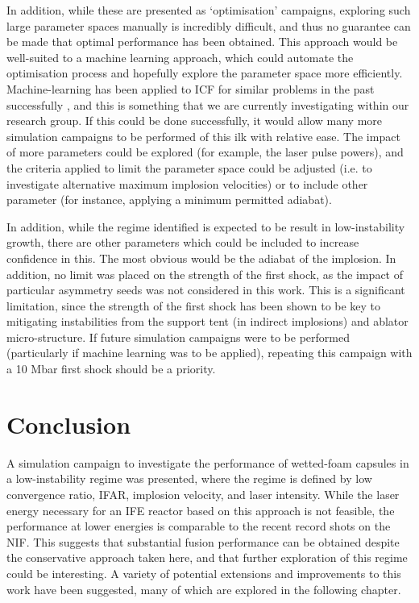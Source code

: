 In addition, while these are presented as `optimisation' campaigns, exploring such large parameter spaces manually is incredibly difficult, and thus no guarantee can be made that optimal performance has been obtained. This approach would be well-suited to a machine learning approach, which could automate the optimisation process and hopefully explore the parameter space more efficiently. Machine-learning has been applied to ICF for similar problems in the past successfully \cite{Hatfield2019}, and this is something that we are currently investigating within our research group. If this could be done successfully, it would allow many more simulation campaigns to be performed of this ilk with relative ease. The impact of more parameters could be explored (for example, the laser pulse powers), and the criteria applied to limit the parameter space could be adjusted (i.e. to investigate alternative maximum implosion velocities) or to include other parameter (for instance, applying a minimum permitted adiabat).

In addition, while the regime identified is expected to be result in low-instability growth, there are other parameters which could be included to increase confidence in this. The most obvious would be the adiabat of the implosion. In addition, no limit was placed on the strength of the first shock, as the impact of particular asymmetry seeds was not considered in this work. This is a significant limitation, since the strength of the first shock has been shown to be key to mitigating instabilities from the support tent (in indirect implosions) and ablator micro-structure. If future simulation campaigns were to be performed (particularly if machine learning was to be applied), repeating this campaign with a 10 Mbar first shock should be a priority.

\section{Conclusion} \label{sec:LowCRConclusions}
A simulation campaign to investigate the performance of wetted-foam capsules in a low-instability regime was presented, where the regime is defined by low convergence ratio, IFAR, implosion velocity, and laser intensity. While the laser energy necessary for an IFE reactor based on this approach is not feasible, the performance at lower energies is comparable to the recent record shots on the NIF. This suggests that substantial fusion performance can be obtained despite the conservative approach taken here, and that further exploration of this regime could be interesting. A variety of potential extensions and improvements to this work have been suggested, many of which are explored in the following chapter.

